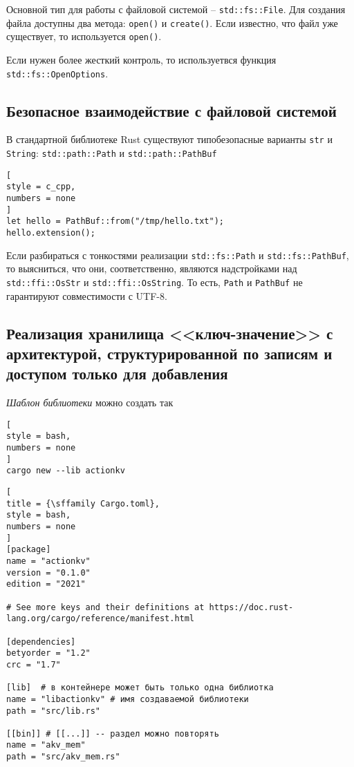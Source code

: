 \documentclass[%
	11pt,
	a4paper,
	utf8,
		]{article}
\begin{document}
Основной тип для работы с файловой системой -- \verb|std::fs::File|. Для создания файла доступны два метода: \verb|open()| и \verb|create()|. Если известно, что файл уже существует, то используется \verb|open()|.

Если нужен более жесткий контроль, то используетвся функция \verb|std::fs::OpenOptions|.

\subsection{Безопасное взаимодействие с файловой системой}

В стандартной библиотеке Rust существуют типобезопасные варианты \verb|str| и \verb|String|: \verb|std::path::Path| и \verb|std::path::PathBuf|
\begin{lstlisting}[
style = c_cpp,
numbers = none
]
let hello = PathBuf::from("/tmp/hello.txt");
hello.extension();
\end{lstlisting}

Если разбираться с тонкостями реализации \verb|std::fs::Path| и \verb|std::fs::PathBuf|, то выясниться, что они, соответственно, являются надстройками над \verb|std::ffi::OsStr| и \verb|std::ffi::OsString|. То есть, \verb|Path| и \verb|PathBuf| не гарантируют совместимости с UTF-8.

\subsection{Реализация хранилища <<ключ-значение>> с архитектурой, структурированной по записям и доступом только для добавления}

\emph{Шаблон библиотеки} можно создать так
\begin{lstlisting}[
style = bash,
numbers = none
]
cargo new --lib actionkv
\end{lstlisting}

\begin{lstlisting}[
title = {\sffamily Cargo.toml},
style = bash,
numbers = none
]
[package]
name = "actionkv"
version = "0.1.0"
edition = "2021"

# See more keys and their definitions at https://doc.rust-lang.org/cargo/reference/manifest.html

[dependencies]
betyorder = "1.2"
crc = "1.7"

[lib]  # в контейнере может быть только одна библиотка
name = "libactionkv" # имя создаваемой библиотеки
path = "src/lib.rs"

[[bin]] # [[...]] -- раздел можно повторять
name = "akv_mem"
path = "src/akv_mem.rs"
\end{lstlisting}
\end{document}
